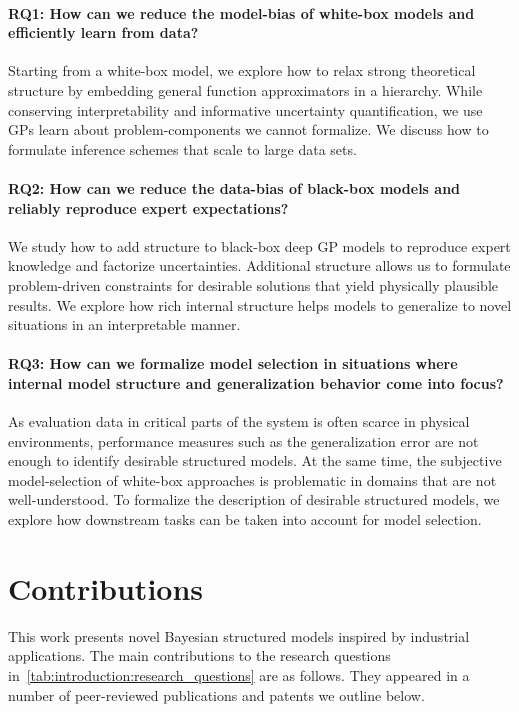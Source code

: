 \paragraph{RQ1: How can we reduce the model-bias of white-box models and efficiently learn from data?}
Starting from a white-box model, we explore how to relax strong theoretical structure by embedding general function approximators in a hierarchy.
While conserving interpretability and informative uncertainty quantification, we use GPs learn about problem-components we cannot formalize.
We discuss how to formulate inference schemes that scale to large data sets.

\paragraph{RQ2: How can we reduce the data-bias of black-box models and reliably reproduce expert expectations?}
We study how to add structure to black-box deep GP models to reproduce expert knowledge and factorize uncertainties.
Additional structure allows us to formulate problem-driven constraints for desirable solutions that yield physically plausible results.
We explore how rich internal structure helps models to generalize to novel situations in an interpretable manner.

\paragraph{RQ3: How can we formalize model selection in situations where internal model structure and generalization behavior come into focus?}
As evaluation data in critical parts of the system is often scarce in physical environments, performance measures such as the generalization error are not enough to identify desirable structured models.
At the same time, the subjective model-selection of white-box approaches is problematic in domains that are not well-understood.
To formalize the description of desirable structured models, we explore how downstream tasks can be taken into account for model selection.

\section{Contributions}
This work presents novel Bayesian structured models inspired by industrial applications.
The main contributions to the research questions in~\cref{tab:introduction:research_questions} are as follows.
They appeared in a number of peer-reviewed publications and patents we outline below.

